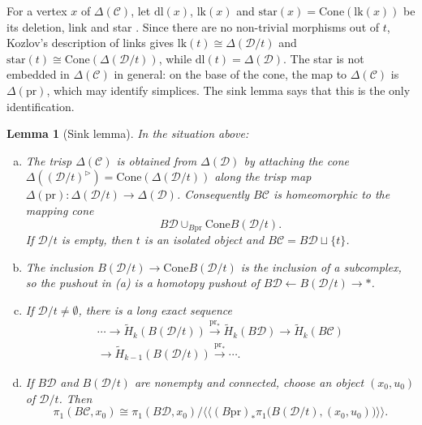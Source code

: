 \documentclass[12pt]{amsart}
\newtheorem{lemma}[teo]{Lemma}
\theoremstyle{definition}
\theoremstyle{remark}
\newcommand{\CC}{\mathcal{C}}
\newcommand{\DD}{\mathcal{D}}
\newcommand{\co}{\colon}
\newcommand{\cone}{\mathrm{Cone}}
\newcommand{\nerve}{\Delta}
\newcommand{\lk}{\mathrm{lk}}
\newcommand{\st}{\mathrm{star}}
\newcommand{\dl}{\mathrm{dl}}
\begin{document}
For a vertex $x$ of $\nerve(\CC)$, let $\dl(x)$, $\lk(x)$ and $\st(x)=\cone(\lk(x))$ be its deletion, link and star \cite[Section~2.3.2]{Kozlov2008}. Since there are no non-trivial morphisms out of $t$, Kozlov's description of links \cite[Section~10.3.3, (10.2), (10.3)]{Kozlov2008} gives $\lk(t)\cong\nerve(\DD/t)$ and $\st(t)\cong\cone(\nerve(\DD/t))$, while $\dl(t)=\nerve(\DD)$. The star is not embedded in $\nerve(\CC)$ in general: on the base of the cone, the map to $\nerve(\CC)$ is $\nerve(\mathrm{pr})$, which may identify simplices. The sink lemma says that this is the only identification.

\begin{lemma}[Sink lemma]\label{lem:sink}
In the situation above:
\begin{enumerate}[(a)]
\item The trisp $\nerve(\CC)$ is obtained from $\nerve(\DD)$ by attaching the cone $\nerve((\DD/t)^{\triangleright})=\cone(\nerve(\DD/t))$ along the trisp map $\nerve(\mathrm{pr})\co\nerve(\DD/t)\to\nerve(\DD)$. Consequently $B\CC$ is homeomorphic to the mapping cone
\[
B\DD\cup_{B\mathrm{pr}}\cone B(\DD/t).
\]
If $\DD/t$ is empty, then $t$ is an isolated object and $B\CC=B\DD\sqcup\{t\}$.
\item The inclusion $B(\DD/t)\to\cone B(\DD/t)$ is the inclusion of a subcomplex, so the pushout in (a) is a homotopy pushout of $B\DD\leftarrow B(\DD/t)\to\ast$.
\item If $\DD/t\neq\emptyset$, there is a long exact sequence
\begin{multline*}
\cdots\to\widetilde H_k(B(\DD/t))\xrightarrow{\mathrm{pr}_*}\widetilde H_k(B\DD)\to\widetilde H_k(B\CC)\\
\to\widetilde H_{k-1}(B(\DD/t))\xrightarrow{\mathrm{pr}_*}\cdots.
\end{multline*}
\item If $B\DD$ and $B(\DD/t)$ are nonempty and connected, choose an object $(x_0,u_0)$ of $\DD/t$. Then
\[
\pi_1(B\CC,x_0)\cong\pi_1(B\DD,x_0)\big/\bigl\langle\!\bigl\langle(B\mathrm{pr})_*\pi_1\bigl(B(\DD/t),(x_0,u_0)\bigr)\bigr\rangle\!\bigr\rangle.
\]
\end{enumerate}
\end{lemma}
\end{document}
